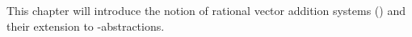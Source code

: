 
\begin{comment}
	\jw{Introduce loop summarization using rational vector addition systems with resets \\
	- What are qvasr? What are qvasr abstractions? what are least upper bounds on abstractions? \\
	- start with qvasr on example that does not need abstraction $\rightarrow$ no relations between variables \\
	- move on to example with relations between variables; show simulation matrix and imaging \\
	- abstractions are an overapproximation \\
	- imprecise because of ignorance of assumptions $\rightarrow$ transfer to next chapter \\
	- usage of running example which is turned to qvasr abstraction \\
	\vspace{1cm}
	20 pages}
\end{comment}

This chapter will introduce the notion of rational vector addition systems (\qvasr) and their extension to \qvasr-abstractions.

